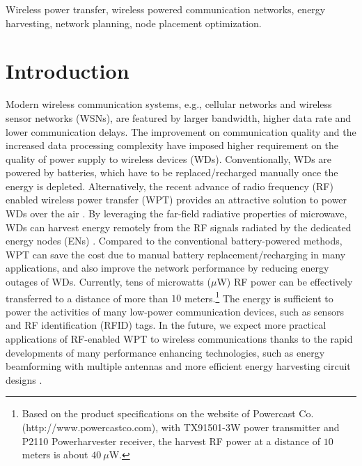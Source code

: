 \documentclass[journal, draftcls, one column, 12pt]{IEEEtran}
\begin{document}
\begin{IEEEkeywords}
Wireless power transfer, wireless powered communication networks, energy harvesting, network planning, node placement optimization.
\end{IEEEkeywords}

\section{Introduction}
Modern wireless communication systems, e.g., cellular networks and wireless sensor networks (WSNs), are featured by larger bandwidth, higher data rate and lower communication delays. The improvement on communication quality and the increased data processing complexity have imposed higher requirement on the quality of power supply to wireless devices (WDs). Conventionally, WDs are powered by batteries, which have to be replaced/recharged manually once the energy is depleted. Alternatively, the recent advance of radio frequency (RF) enabled wireless power transfer (WPT) provides an attractive solution to power WDs over the air \cite{2014:Bi,2015:Lu}. By leveraging the far-field radiative properties of microwave, WDs can harvest energy remotely from the RF signals radiated by the dedicated energy nodes (ENs) \cite{2013:Zhou}. Compared to the conventional battery-powered methods, WPT can save the cost due to manual battery replacement/recharging in many applications, and also improve the network performance by reducing energy outages of WDs. Currently, tens of microwatts ($\mu$W) RF power can be effectively transferred to a distance of more than $10$ meters.\footnote{Based on the product specifications on the website of Powercast Co. (http://www.powercastco.com), with TX91501-3W power transmitter and P2110 Powerharvester receiver, the harvest RF power at a distance of $10$ meters is about $40\ \mu$W.} The energy is sufficient to power the activities of many low-power communication devices, such as sensors and RF identification (RFID) tags. In the future, we expect more practical applications of RF-enabled WPT to wireless communications thanks to the rapid developments of many performance enhancing technologies, such as energy beamforming with multiple antennas \cite{2013:Zhang} and more efficient energy harvesting circuit designs \cite{2010:Georgiadis}.
\end{document}
